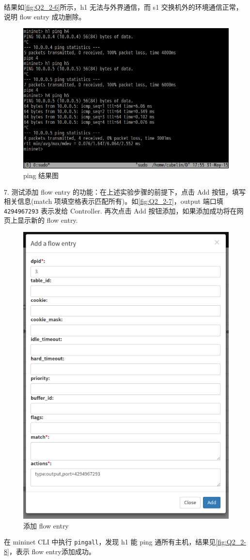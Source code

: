 \documentclass[format=draft,language=chinese,category=SDN]{hustreport}
\newcommand{\code}{\texttt}
\begin{document}
结果如\autoref{fig:Q2_2-6}所示，h1 无法与外界通信，而 s1 交换机外的环境通信正常，说明 flow entry 成功删除。

\begin{figure}[!h]
\centering
\includegraphics[width=.618\textwidth]{fig/2_2-6.png}
\caption{ping 结果图}\label{fig:Q2_2-6}
\end{figure}

7. 测试添加 flow entry 的功能：在上述实验步骤的前提下，点击 Add 按钮，填写相关信息(match 项填空格表示匹配所有)。如\autoref{fig:Q2_2-7}，output 端口填 \code{4294967293} 表示发给 Controller. 再次点击 Add 按钮添加，如果添加成功将在网页上显示新的 flow entry.

\begin{figure}[!h]
\centering
\includegraphics[width=.618\textwidth]{fig/2_2-7.png}
\caption{添加 flow entry}\label{fig:Q2_2-7}
\end{figure}

在 mininet CLI 中执行 \code{pingall}，发现 h1 能 ping 通所有主机，结果见\autoref{fig:Q2_2-8}，表示 flow entry添加成功。
\end{document}

